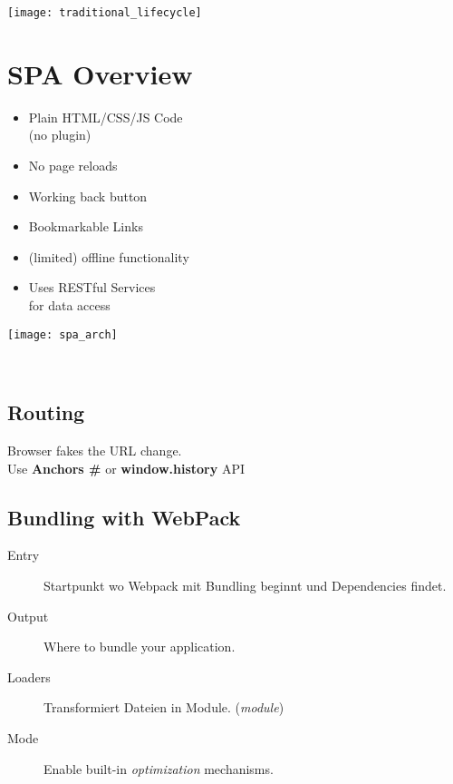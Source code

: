 

\newcommand{\TITLE}{Web Engineering 3}
\newcommand{\AUTHOR}{Mona Panchaud}
\newcommand{\INSTITUTE}{Ostschweizer Fachhochschule}




\begin{multicols*}{4}

\texttt{[image: traditional\_lifecycle]}


\section{SPA Overview}


\begin{minipage}[c]{.6\linewidth}
    \begin{itemize}
        \item Plain HTML/CSS/JS Code \\(no plugin)
        \item No page reloads
        \item Working back button
        \item Bookmarkable Links
        \item (limited) offline functionality
        \item Uses RESTful Services \\for data access
    \end{itemize}
\end{minipage}%
\begin{minipage}[c]{.4\linewidth}
    \texttt{[image: spa\_arch]}
\end{minipage}%
\\ %

\subsection{Routing}
Browser fakes the URL change.
\\
Use \textbf{Anchors \#} or \textbf{window.history} API

\subsection{Bundling with WebPack}
\begin{description}
    \item[Entry] Startpunkt wo Webpack mit Bundling beginnt und
    Dependencies findet.
    \item[Output] Where to bundle your application.
    \item[Loaders] Transformiert Dateien in Module. (\textit{module})
    \item[Mode] Enable built-in \textit{optimization} mechanisms.
\end{description}


\end{multicols*}
